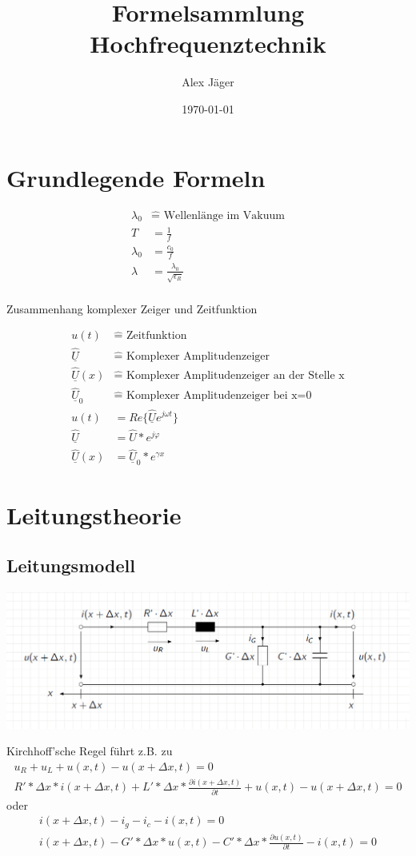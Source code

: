 \documentclass[11pt]{scrartcl}
\author{Alex Jäger}
\title{Formelsammlung Hochfrequenztechnik}
\date{\today}
\def\Uc{\underline{\hat U}}
\begin{document}
\maketitle
\newpage
\section{Grundlegende Formeln}
\begin{align}
	\lambda_0 & \hat{=}\text{ Wellenlänge im Vakuum} \\
	T&=\frac{1}{f} \\
	\lambda _0&=\frac{c_0}{f} \\
	\lambda&=\frac{\lambda_0}{\sqrt{\epsilon_R}} \\
\end{align}
\begin{center}
	Zusammenhang komplexer Zeiger und Zeitfunktion
\end{center}
\begin{align}
	u(t) & \hat{=} \text{ Zeitfunktion} \\
	\Uc & \hat{=} \text{ Komplexer Amplitudenzeiger} \\
	\Uc(x) & \hat{=} \text{ Komplexer Amplitudenzeiger an der Stelle x} \\
	\Uc_0 & \hat{=} \text{ Komplexer Amplitudenzeiger bei x=0} \\
	u(t)&=Re\{\Uc e^{j\omega t}\} \\
	\Uc &=\hat U*e^{j\varphi} \\
	\Uc(x)&=\Uc_0*e^{\gamma x}
\end{align}

\section{Leitungstheorie}
\subsection{Leitungsmodell}
\begin{center}
	\includegraphics[width=\textwidth]{Grafiken/01_Leitungsmodell.png}
\end{center}
Kirchhoff'sche Regel führt z.B. zu
\begin{gather}
	u_R+u_L+u(x,t)-u(x+\Delta x,t)=0 \\	
	R'*\Delta x*i(x+\Delta x,t)+L'*\Delta x*\frac{\partial i(x+\Delta x,t)}{\partial t}+u(x,t)-u(x+\Delta x,t)=0
\end{gather}
oder
\begin{gather}
	i(x+\Delta x,t)-i_g-i_c-i(x,t)=0 \\
	i(x+\Delta x,t)-G'*\Delta x*u(x,t)-C'*\Delta x*\frac{\partial u(x,t)}{\partial t}-i(x,t)=0
\end{gather}
\end{document}
